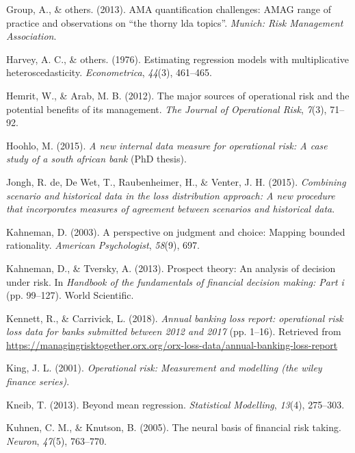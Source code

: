 \documentclass{DissertateUSU}
\begin{document}
\leavevmode\hypertarget{ref-ama2013ama}{}%
Group, A., \& others. (2013). AMA quantification challenges: AMAG range
of practice and observations on ``the thorny lda topics''. \emph{Munich:
Risk Management Association}.

\leavevmode\hypertarget{ref-harvey1976estimating}{}%
Harvey, A. C., \& others. (1976). Estimating regression models with
multiplicative heteroscedasticity. \emph{Econometrica}, \emph{44}(3),
461--465.

\leavevmode\hypertarget{ref-hemrit2012major}{}%
Hemrit, W., \& Arab, M. B. (2012). The major sources of operational risk
and the potential benefits of its management. \emph{The Journal of
Operational Risk}, \emph{7}(3), 71--92.

\leavevmode\hypertarget{ref-hoohlo2015new}{}%
Hoohlo, M. (2015). \emph{A new internal data measure for operational
risk: A case study of a south african bank} (PhD thesis).

\leavevmode\hypertarget{ref-de2015combining}{}%
Jongh, R. de, De Wet, T., Raubenheimer, H., \& Venter, J. H. (2015).
\emph{Combining scenario and historical data in the loss distribution
approach: A new procedure that incorporates measures of agreement
between scenarios and historical data}.

\leavevmode\hypertarget{ref-kahneman2003perspective}{}%
Kahneman, D. (2003). A perspective on judgment and choice: Mapping
bounded rationality. \emph{American Psychologist}, \emph{58}(9), 697.

\leavevmode\hypertarget{ref-kahneman2013prospect}{}%
Kahneman, D., \& Tversky, A. (2013). Prospect theory: An analysis of
decision under risk. In \emph{Handbook of the fundamentals of financial
decision making: Part i} (pp. 99--127). World Scientific.

\leavevmode\hypertarget{ref-orxablr2018}{}%
Kennett, R., \& Carrivick, L. (2018). \emph{Annual banking loss report:
operational risk loss data for banks submitted between 2012 and 2017}
(pp. 1--16). Retrieved from
\url{https://managingrisktogether.orx.org/orx-loss-data/annual-banking-loss-report}

\leavevmode\hypertarget{ref-king2001operational}{}%
King, J. L. (2001). \emph{Operational risk: Measurement and modelling
(the wiley finance series)}.

\leavevmode\hypertarget{ref-kneib2013beyond}{}%
Kneib, T. (2013). Beyond mean regression. \emph{Statistical Modelling},
\emph{13}(4), 275--303.

\leavevmode\hypertarget{ref-kuhnen2005neural}{}%
Kuhnen, C. M., \& Knutson, B. (2005). The neural basis of financial risk
taking. \emph{Neuron}, \emph{47}(5), 763--770.
\end{document}

